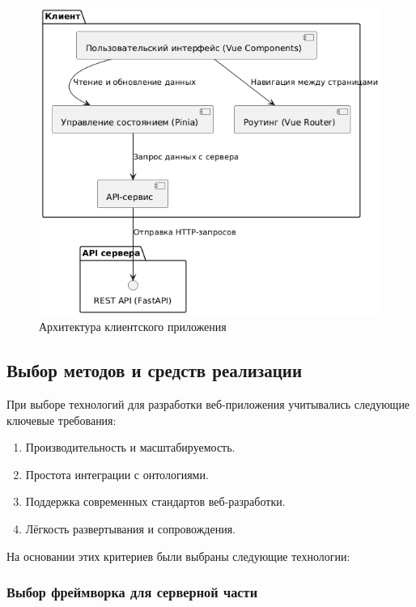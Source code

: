 \begin{figure}[H]
    \centering
    \includegraphics[width=\linewidth]{VKR/img/client_arch.png}
    \caption{Архитектура клиентского приложения}
    \label{pic:client_arch}
\end{figure}

\subsection{Выбор методов и средств реализации}

При выборе технологий для разработки веб-приложения учитывались следующие ключевые требования:
\begin{enumerate}
    \item Производительность и масштабируемость.
    \item Простота интеграции с онтологиями.
    \item Поддержка современных стандартов веб-разработки.
    \item Лёгкость развертывания и сопровождения.
\end{enumerate}

На основании этих критериев были выбраны следующие технологии:

\subsubsection{Выбор фреймворка для серверной части}

